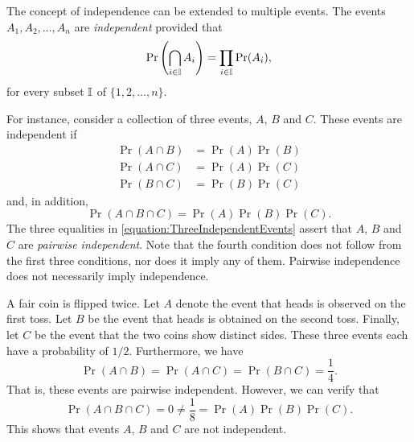 The concept of independence can be extended to multiple events.
The events $A_1, A_2, \ldots, A_n$ are \emph{independent} provided that 
\begin{equation} \label{equation:IndependenceMultipleEvents}
\Pr \left( \bigcap_{i \in \mathbb{I}} A_i \right)
= \prod_{i \in \mathbb{I}} \Pr (A_i) ,
\end{equation}
for every subset $\mathbb{I}$ of $\{1, 2, \ldots, n\}$.

For instance, consider a collection of three events, $A$, $B$ and $C$.
These events are independent if
\begin{equation} \label{equation:ThreeIndependentEvents}
\begin{split}
\Pr (A \cap B) &= \Pr (A) \Pr (B) \\
\Pr (A \cap C) &= \Pr (A) \Pr (C) \\
\Pr (B \cap C) &= \Pr (B) \Pr (C)
\end{split}
\end{equation}
and, in addition,
\begin{equation*}
\Pr (A \cap B \cap C) = \Pr (A) \Pr (B) \Pr(C) .
\end{equation*}
The three equalities in \eqref{equation:ThreeIndependentEvents} assert that $A$, $B$ and $C$ are \emph{pairwise independent}.
Note that the fourth condition does not follow from the first three conditions, nor does it imply any of them.
Pairwise independence does not necessarily imply independence.

\begin{example}
A fair coin is flipped twice.
Let $A$ denote the event that heads is observed on the first toss.
Let $B$ be the event that heads is obtained on the second toss.
Finally, let $C$ be the event that the two coins show distinct sides.
These three events each have a probability of $1/2$.
Furthermore, we have
\begin{equation*}
\Pr (A \cap B) = \Pr (A \cap C) = \Pr (B \cap C) = \frac{1}{4} .
\end{equation*}
That is, these events are pairwise independent.
However, we can verify that
\begin{equation*}
\Pr (A \cap B \cap C) = 0 \neq \frac{1}{8} = \Pr (A) \Pr (B) \Pr (C) .
\end{equation*}
This shows that events $A$, $B$ and $C$ are not independent.
\end{example}

